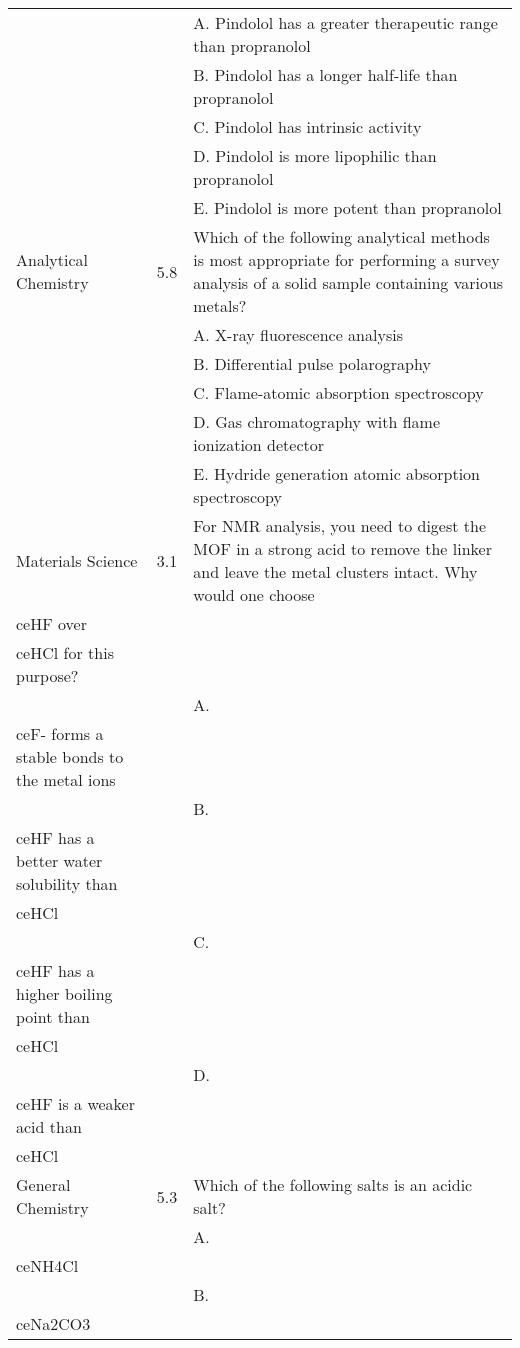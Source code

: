 \begin{table*}[!t]
\begin{tabular}{p{2.7cm}cp{10cm}}
        & & A. Pindolol has a greater therapeutic range than propranolol \\
        & & B. Pindolol has a longer half-life than propranolol \\
        & & C. Pindolol has intrinsic activity \\
        & & D. Pindolol is more lipophilic than propranolol \\
        & & E. Pindolol is more potent than propranolol \\
        \midrule
        Analytical Chemistry & 5.8 & Which of the following analytical methods is most appropriate for performing a survey analysis of a solid sample containing various metals? \\
        & & A. X-ray fluorescence analysis \\
        & & B. Differential pulse polarography \\
        & & C. Flame-atomic absorption spectroscopy \\
        & & D. Gas chromatography with flame ionization detector \\
        & & E. Hydride generation atomic absorption spectroscopy \\
        \midrule
        Materials Science & 3.1 & For NMR analysis, you need to digest the MOF in a strong acid to remove the linker and leave the metal clusters intact. Why would one choose \\ce{HF} over \\ce{HCl} for this purpose? \\
        & & A. \\ce{F-} forms a stable bonds to the metal ions \\
        & & B. \\ce{HF} has a better water solubility than \\ce{HCl} \\
        & & C. \\ce{HF} has a higher boiling point than \\ce{HCl} \\
        & & D. \\ce{HF} is a weaker acid than \\ce{HCl} \\
        \midrule
        General Chemistry & 5.3 & Which of the following salts is an acidic salt? \\
        & & A. \\ce{NH4Cl} \\
        & & B. \\ce{Na2CO3} \\

\end{tabular}
\end{table*}
